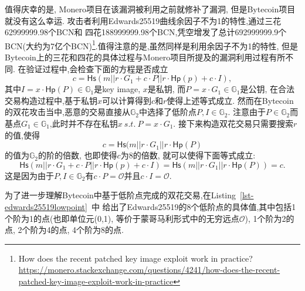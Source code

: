 \documentclass{article}
\renewcommand{\G}{\mathbb{G}}
\begin{document}
值得庆幸的是, Monero项目在该漏洞被利用之前就修补了漏洞, 但是Bytecoin项目就没有这么幸运.
攻击者利用Edwards25519曲线余因子不为1的特性,通过三花62999999.98个BCN和
四花188999999.98个BCN,凭空增发了总计692999999.9个BCN(大约为7亿个BCN)\footnote{
How does the recent patched key image exploit work in practice?
\url{https://monero.stackexchange.com/questions/4241/how-does-the-recent-patched-key-image-exploit-work-in-practice}}.值得注意的是,虽然同样是利用余因子不为1的特性,
但是Bytecoin上的三花和四花的具体过程与Monero项目所提及的漏洞利用过程有所不同.
在验证过程中,会检查下面的方程是否成立
$$c = \textsf{Hs}(m || r\cdot G_1 + c\cdot P || r\cdot \textsf{Hp}(p) + c\cdot I),$$
其中$I = x\cdot \textsf{Hp}(P)\in\G_1$是key image, $x$是私钥, 而$P = x\cdot G_1 \in\G_1$是公钥,
在合法交易构造过程中,基于私钥$x$可以计算得到$c$和$r$使得上述等式成立.
然而在Bytecoin的双花攻击当中,恶意的交易直接从$\G_2$中选择了低阶点$P, I \in\G_2$.
注意由于$P\in\G_2$而基点$G_1\in\G_1$,此时并不存在私钥$x \ s.t.\ P = x\cdot G_1$.
接下来构造双花交易只需要搜索$r$的值,使得
$$c = \textsf{Hs}(m || r\cdot G_1 || r\cdot \textsf{Hp}(P)$$
的值为$\G_2$的阶的倍数, 也即使得$c$为8的倍数, 就可以使得下面等式成立:
$$\textsf{Hs}(m || r\cdot G_1 + c\cdot P || r\cdot \textsf{Hp}(p) + c\cdot I) =
\textsf{Hs}(m || r\cdot G_1 || r\cdot \textsf{Hp}(P)) = c.$$
这是因为由于$P, I \in \G_2$有$c\cdot P = \mathcal{O}$并且$c\cdot I = \mathcal{O}$.

为了进一步理解Bytecoin中基于低阶点完成的双花交易,在Listing~\ref{lst-edwards25519lowpoint}~中
给出了Edwards25519的8个低阶点的具体值,其中包括1个阶为1的点(也即单位元(0,1),
等价于蒙哥马利形式中的无穷远点$\mathcal{O}$), 1个阶为2的点, 2个阶为4的点, 4个阶为8的点.
\end{document}
